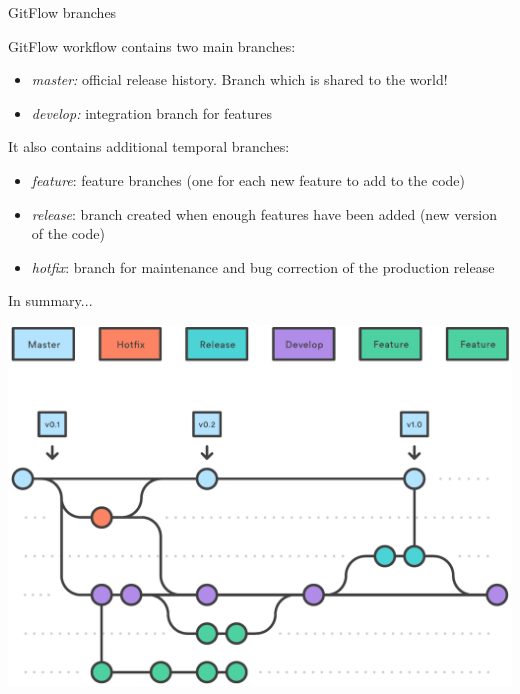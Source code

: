 \documentclass[svgnames]{beamer}
\begin{document}
\begin{frame}{GitFlow branches}

    GitFlow workflow contains two main branches:
    \begin{itemize}
        \item{\emph{master:} official release history. Branch which is shared to the world!}
        \item{\emph{develop:} integration branch for features}
    \end{itemize}

    It also contains additional temporal branches:
    \begin{itemize}
        \item{\emph{feature}: feature branches (one for each new feature to add to the code)}
        \item{\emph{release}: branch created when enough features have been added (new version of the code)}
        \item{\emph{hotfix}: branch for maintenance and bug correction of the production release}
    \end{itemize}

\end{frame}

\begin{frame}{In summary...}

    \begin{center}
        \includegraphics[scale=0.5]{img/05-_2_.pdf}    
    \end{center}

\end{frame}    
\end{document}
